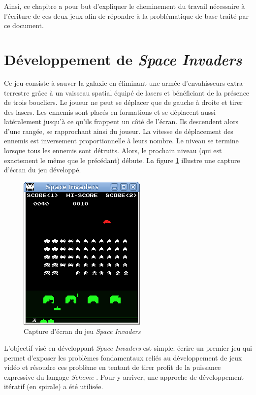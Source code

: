 \documentclass[12pt,twoside,letterpaper,francais]{book}
\newcommand{\si}{{\textit{Space Invaders }}}
\newcommand{\Schemelang}{{\textit{Scheme }}}
\begin{document}
Ainsi, ce chapitre a pour but d'expliquer le cheminement du travail
nécessaire à l'écriture de ces deux jeux afin de répondre à la
problématique de base traité par ce document.


\FloatBarrier
\section{Développement de \si} \label{Exp:SI}
Ce jeu consiste à \og sauver la galaxie \fg en éliminant une armée
d'envahisseurs extra-terrestre grâce à un vaisseau spatial équipé de
lasers et bénéficiant de la présence de trois boucliers. Le joueur ne
peut se déplacer que de gauche à droite et tirer des lasers. Les
ennemis sont placés en formations et se déplacent aussi latéralement
jusqu'à ce qu'ils frappent un côté de l'écran. Ils descendent alors
d'une rangée, se rapprochant ainsi du joueur. La vitesse de
déplacement des ennemis est inversement proportionnelle à leurs
nombre. Le niveau se termine lorsque tous les ennemis sont
détruits. Alors, le prochain niveau (qui est exactement le même que le
précédant) débute. La figure \ref{Exp:si-screen} illustre une capture
d'écran du jeu développé.\\

\begin{figure}[htb!]
  \center
  \includegraphics[scale=0.7]{space-invaders-screenshot}
  \caption{Capture d'écran du jeu \si}
  \label{Exp:si-screen}
\end{figure}

L'objectif visé en développant \si est simple: écrire un premier jeu
qui permet d'exposer les problèmes fondamentaux reliés au
développement de jeux vidéo et résoudre ces problème en tentant de
tirer profit de la puissance expressive du langage \Schemelang. Pour y
arriver, une approche de développement itératif (en spirale) a été
utilisée.
\end{document}
